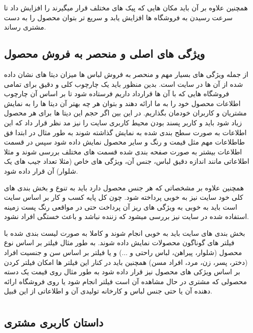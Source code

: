 \documentclass[12pt,a4paper]{article}
\begin{document}
	همچنین علاوه بر آن باید مکان هایی که پیک های مختلف قرار میگیرند را افزایش داد تا سرعت رسیدن به فروشگاه ها افزایش یابد و سریع تر بتوان محصول را به دست مشتری رساند.
	
	
	\subsection{\textbf{ویژگی های اصلی و منحصر به فروش محصول}} \label{section.productVision.features}
	
	
	از جمله ویژگی های بسیار مهم و منحصر به فروش لباس ها میزان دیتا های نشان داده شده از آن ها در سایت است. بدین منظور باید یک چارچوب کلی و دقیق برای تمامی فروشگاه هایی که با آن ها قرارداد داریم فرستاده شود تا بر اساس آن چارچوب اطلاعات محصول خود را به ما ارائه دهند و بتوان هر چه بهتر آن دیتا ها را به نمایش مشتریان و کاربران خودمان بگذاریم. در این بین اگر حجم این دیتا ها برای هر محصول زیاد شود باید  و کاربر پسند بودن محیط کاربری سایت را نیز مد نظر قرار داد که این اطلاعات به صورت سطح بندی شده به نمایش گذاشته شوند به طور مثال در ابتدا فق طاطلاعات مهم مثل قیمت و رنگ و سایر محصول نمایش داده شود سپس در قسمت اطلاعات بیشتر به صورت صفحه بندی شده قسمت های مختلف بررسی شوند و مثلا اطلاعاتی مانند اندازه دقیق لباس، جنس آن، ویژگی های خاص (مثلا تعداد جیب های یک شلوار) آن قرار داده شود.
	
	
	همچنین علاوه بر مشخصاتی که هر جنس محصول دارد باید به تنوع و بخش بندی های کلی خود سایت نیز به خوبی پرداخته شود. چون کل پایه کسب و کار بر اساس سایت است باید به خوبی به ویژگی های ریز آن پرداخت حتی در مواقعی رنگ پست زمینه استفاده شده در سایت نیز بررسی میشود که زننده نباشد و باعث خستگی افراد نشود.
	
	
	بخش بندی های سایت باید به خوبی انجام شوند و کاملا به صورت لیست بندی شده با فیلتر های گوناگون محصولات نمایش داده شوند. به طور مثال فیلتر بر اساس نوع محصول (شلوار، پیراهن، لباس راحتی و ...) و یا فیلتر بر اساس سن و جنسیت افراد (دختر، پسر، زن، مرد، افراد مسن) همچنین باید در کنار این فیلتر ها امکان فیلتر کردن بر اساس ویژکی های محصول نیز قرار داده شود به طور مثال روی قیمت یک دسته محصولی که مشتری در حال مشاهده آن است فیلتر انجام شود یا روی فروشگاه ارائه دهنده آن یا حتی جنس لباس و کارخانه تولیدی آن و اطلاعاتی از این قبیل.
	
\pagebreak	
	

\section{} \label{section.userStory}

\subsection{\textbf{داستان کاربری مشتری}} \label{section.userStory.customer}
\end{document}
